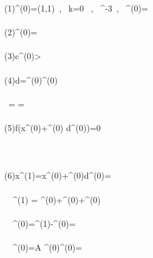 \documentclass[]{report}
\begin{document}
\begin{program}
\left(1\right)\quad {}^{(0)}=\left(1,1\right)\ , \, k=0 \ , \ ^{-3}\ , \ ^{(0)}=\left[\begin{array}{cc}1 & 0 \\0 &1\end{array}\right] \\~ \\
\left(2\right)\quad {}^{(0)}=\left[-4 \ , \ 2\right]\\~  \\
\left(3\right)\quad \lvert \mathbf c^{(0)}>\epsilon\\~  \\
\left(4\right)\quad \mathbf d=^{(0)}^{(0)}\\~  \\
\quad \quad \quad \ = \left[\begin{array}{cc}1 & 0 \\ 0& 1 \end{array}\right]\left[\begin{array}{c}-4 \\ 2\end{array}\right]=\left[\begin{array}{c}-4\\ 2\end{array}\right]\\~  \\
\left(5\right)\quad \delta f\left(\mathbf x^{(0)}+\alpha^{(0)} \mathbf d^{(0)}\right)=0\\~\\
\quad \quad \quad {}\\~\\
\left(6\right)\quad \mathbf x^{(1)}=\mathbf x^{(0)}+\alpha^{(0)}\mathbf d^{(0)}=\left[2\ , \ 0.5\right]\\~  \\
\quad \quad \ \  ^{(1)} = ^{(0)}+^{(0)}+^{(0)}\\~  \\
\quad \quad \ \ ^{(0)}=^{(1)}-^{(0)}=\left[\begin{array}{c}3\\ -4\end{array}\right]\\~  \\
\quad \quad \ \ ^{(0)}={\mathbf A }^{(0)}^{(0)}=\left[\begin{array}{c}3\\ -4\end{array}\right]\\~  \\

\end{program}
\end{document}
